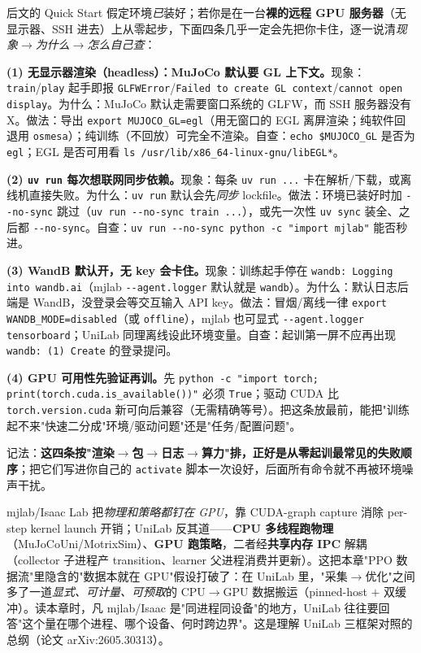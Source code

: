 \begin{pitfall}
后文的 Quick Start 假定环境\emph{已}装好；若你是在一台\textbf{裸的远程 GPU 服务器}（无显示器、SSH 进去）上从零起步，下面四条几乎一定会先把你卡住，逐一说清\emph{现象$\to$为什么$\to$怎么自己查}：

\textbf{(1) 无显示器渲染（headless）：MuJoCo 默认要 GL 上下文。}现象：\verb|train|/\verb|play| 起手即报 \verb|GLFWError|/\verb|Failed to create GL context|/\verb|cannot open display|。为什么：MuJoCo 默认走需要窗口系统的 GLFW，而 SSH 服务器没有 X。做法：导出 \verb|export MUJOCO_GL=egl|（用无窗口的 EGL 离屏渲染；纯软件回退用 \verb|osmesa|）；纯训练（不回放）可完全不渲染。自查：\verb|echo $MUJOCO_GL| 是否为 \verb|egl|；EGL 是否可用看 \verb|ls /usr/lib/x86_64-linux-gnu/libEGL*|。

\textbf{(2) \texttt{uv run} 每次想联网同步依赖。}现象：每条 \verb|uv run ...| 卡在解析/下载，或离线机直接失败。为什么：\verb|uv run| 默认会先\emph{同步} lockfile。做法：环境已装好时加 \verb|--no-sync| 跳过（\verb|uv run --no-sync train ...|），或先一次性 \verb|uv sync| 装全、之后都 \verb|--no-sync|。自查：\verb|uv run --no-sync python -c "import mjlab"| 能否秒进。

\textbf{(3) WandB 默认开，无 key 会卡住。}现象：训练起手停在 \verb|wandb: Logging into wandb.ai|（mjlab \verb|--agent.logger| 默认就是 \verb|wandb|）。为什么：默认日志后端是 WandB，没登录会等交互输入 API key。做法：冒烟/离线一律 \verb|export WANDB_MODE=disabled|（或 \verb|offline|），mjlab 也可显式 \verb|--agent.logger tensorboard|；UniLab 同理离线设此环境变量。自查：起训第一屏不应再出现 \verb|wandb: (1) Create| 的登录提问。

\textbf{(4) GPU 可用性先验证再训。}先 \verb|python -c "import torch; print(torch.cuda.is_available())"| 必须 \verb|True|；驱动 CUDA 比 \verb|torch.version.cuda| 新可向后兼容（无需精确等号）。把这条放最前，能把"训练起不来"快速二分成"环境/驱动问题"还是"任务/配置问题"。

记法：\textbf{这四条按"渲染$\to$包$\to$日志$\to$算力"排，正好是从零起训最常见的失败顺序}；把它们写进你自己的 \verb|activate| 脚本一次设好，后面所有命令就不再被环境噪声干扰。
\end{pitfall}

\begin{insight}\label{ins:rlmc-unilab-heterogeneous}
mjlab/Isaac Lab 把\emph{物理和策略都钉在 GPU}，靠 CUDA-graph capture 消除 per-step kernel launch 开销；UniLab 反其道——\textbf{CPU 多线程跑物理}（MuJoCoUni/MotrixSim）、\textbf{GPU 跑策略}，二者经\textbf{共享内存 IPC} 解耦（collector 子进程产 transition、learner 父进程消费并更新）。这把本章"PPO 数据流"里隐含的"数据本就在 GPU"假设打破了：在 UniLab 里，"采集$\to$优化"之间多了一道\emph{显式、可计量、可预取}的 CPU$\to$GPU 数据搬运（pinned-host $+$ 双缓冲）。读本章时，凡 mjlab/Isaac 是"同进程同设备"的地方，UniLab 往往要回答"这个量在哪个进程、哪个设备、何时跨边界"。这是理解 UniLab 三框架对照的总纲（论文 arXiv:2605.30313）。
\end{insight}

